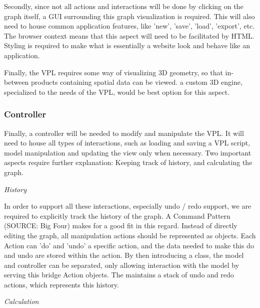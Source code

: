 Secondly, since not all actions and interactions will be done by clicking on the graph itself, a \ac{GUI} surrounding this graph visualization is required.
This will also need to house common application features, like 'new', 'save', 'load', 'export', etc.  
The browser context means that this aspect will need to be facilitated by HTML. 
Styling is required to make what is essentially a website look and behave like an application. 

Finally, the VPL requires some way of visualizing 3D geometry, so that in-between products containing spatial data can be viewed. 
a custom 3D engine, specialized to the needs of the VPL, would be best option for this aspect.

\subsubsection*{Controller}

Finally, a controller will be needed to modify and manipulate the VPL.
It will need to house all types of interactions, such as loading and saving a VPL script, model manipulation and updating the view only when necessary.
Two important aspects require further explanation: Keeping track of history, and calculating the graph. 

\emph{History}

In order to support all these interactions, especially undo / redo support, we are required to explicitly track the history of the graph. 
A Command Pattern (SOURCE: Big Four) makes for a good fit in this regard.
Instead of directly editing the graph, all manipulation actions should be represented as  objects. 
Each Action can 'do' and 'undo' a specific action, and the data needed to make this do and undo are stored within the action. 
By then introducing a  class, the model and controller can be separated, only allowing interaction with the model by serving this bridge Action objects. The  maintains a stack of undo and redo actions, which represents this history.  


\emph{Calculation}

